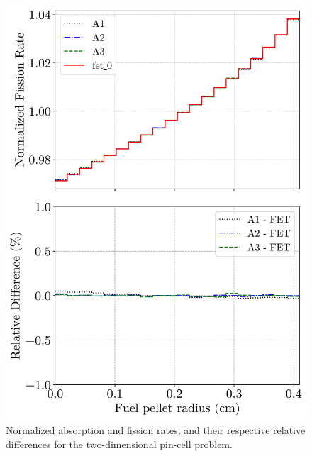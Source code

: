 \begin{figure}
\begin{minipage}{.51\textwidth}
      \includegraphics[width=\textwidth]{figs/pin_2d_fiss.pdf}
    \end{minipage}
    \caption[Normalized absorption and fission rates]{Normalized absorption and fission rates, and their respective relative differences for the two-dimensional pin-cell problem.}
    \label{fig_42}
\end{figure}

